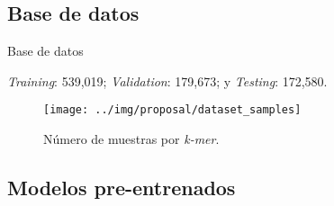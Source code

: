 \documentclass[10pt]{beamer}
\newcommand{\1}{
	\setbeamertemplate{background}{
		\texttt{[image: img/1]}
		\tikz[overlay] \fill[fill opacity=0.75,fill=white] (0,0) rectangle (-\paperwidth,\paperheight);
	}
}
\begin{document}
\subsection{Base de datos}

\begin{frame}{Base de datos}{}
	
	\textit{Training}: 539,019; \textit{Validation}: 179,673; y \textit{Testing}: 172,580.
	
	\begin{figure}[]
		\centering\texttt{[image: ../img/proposal/dataset\_samples]}
		\caption{
			Número de muestras por  \textit{k-mer}.}
		\label{fig:samples}
	\end{figure}
	
\end{frame}

\subsection{Modelos pre-entrenados}
\end{document}
